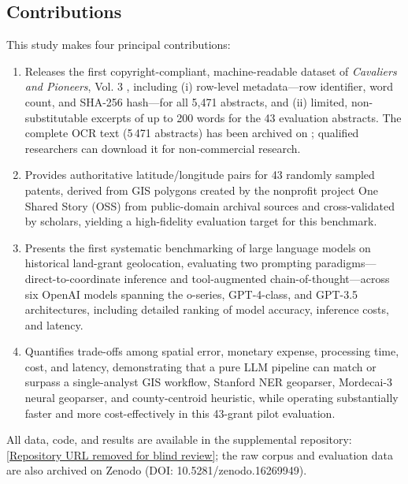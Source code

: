 \subsection{Contributions}\label{contributions}

This study makes four principal contributions:

\begin{enumerate}
\def\labelenumi{\arabic{enumi}.}
\tightlist
\item
  Releases the first copyright-compliant, machine-readable dataset of
  \emph{Cavaliers and Pioneers}, Vol. 3 \citep{Nugent1979_cavaliers3},
  including (i) row-level metadata---row identifier, word count, and
  SHA-256 hash---for all 5,471 abstracts, and (ii) limited,
  non-substitutable excerpts of up to 200 words for the 43 evaluation
  abstracts. The complete OCR text (5\,471 abstracts) has been archived
  on \DIFdelbegin \textbf{}%
\DIFdelend \DIFaddbegin {}\DIFaddend ; qualified researchers can
  download it for non‑commercial research.
\item
  Provides authoritative latitude/longitude pairs for 43 randomly
  sampled patents, derived from GIS polygons created by the nonprofit
  project One Shared Story (OSS) from public-domain archival sources and
  cross-validated by scholars, yielding a high-fidelity evaluation
  target for this benchmark.
\item
  Presents the first systematic benchmarking of large language models on
  historical land-grant geolocation, evaluating two prompting
  paradigms---direct-to-coordinate inference and tool-augmented
  chain-of-thought---across six OpenAI models spanning the o-series,
  GPT-4-class, and GPT-3.5 architectures, including detailed ranking of
  model accuracy, inference costs, and latency.
\item
  Quantifies trade-offs among spatial error, monetary expense,
  processing time, cost, and latency, demonstrating that a pure LLM
  pipeline can match or surpass a single-analyst GIS workflow, Stanford
  NER geoparser, Mordecai-3 neural geoparser, and county-centroid
  heuristic, while operating substantially faster and more
  cost-effectively in this 43-grant pilot evaluation.
\end{enumerate}

All data, code, and results are available in the supplemental
repository:
\url{[Repository URL removed for blind review]}; the
raw corpus and evaluation data are also archived on Zenodo (DOI:
10.5281/zenodo.16269949).

